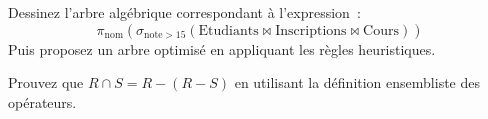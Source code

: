 \begin{exercice}
Dessinez l'arbre alg\'ebrique correspondant \`a l'expression~:
\[
\pi_{\text{nom}}(\sigma_{\text{note} > 15}(\text{Etudiants} \bowtie \text{Inscriptions} \bowtie \text{Cours}))
\]
Puis proposez un arbre optimis\'e en appliquant les r\`egles heuristiques.
\end{exercice}

\begin{exercice}
Prouvez que $R \cap S = R - (R - S)$ en utilisant la d\'efinition ensembliste
des op\'erateurs.
\end{exercice}
